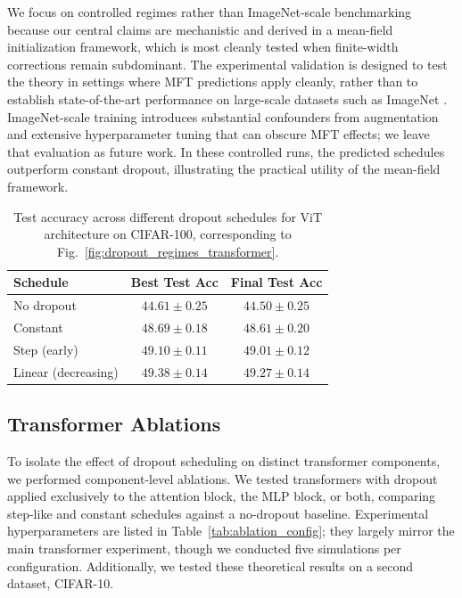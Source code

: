 \documentclass{article}
\theoremstyle{plain}
\theoremstyle{definition}
\theoremstyle{remark}
\begin{document}
We focus on controlled regimes rather than ImageNet-scale benchmarking because our central claims are mechanistic and derived in a mean-field initialization framework, which is most cleanly tested when finite-width corrections remain subdominant. The experimental validation is designed to test the theory in settings where MFT predictions apply cleanly, rather than to establish state-of-the-art performance on large-scale datasets such as ImageNet \cite{imagenet}. ImageNet-scale training introduces substantial confounders from augmentation and extensive hyperparameter tuning that can obscure MFT effects; we leave that evaluation as future work. In these controlled runs, the predicted schedules outperform constant dropout, illustrating the practical utility of the mean-field framework.

\begin{table}[h]
 \caption{Test accuracy across different dropout schedules for ViT architecture on CIFAR-100, corresponding to Fig.~\ref{fig:dropout_regimes_transformer}.}
 \label{tab:schedule_comparison_cifar_100}
 \centering
 \footnotesize
 \begin{tabular}{l c c}
 \toprule
 \textbf{Schedule} & \textbf{Best Test Acc} & \textbf{Final Test Acc} \\
 \midrule
 No dropout & $44.61 \pm 0.25$ & $44.50 \pm 0.25$ \\
 Constant & $48.69 \pm 0.18$ & $48.61 \pm 0.20$ \\
 Step (early) & $49.10 \pm 0.11$ & $49.01 \pm 0.12$ \\
 Linear (decreasing) & $49.38 \pm 0.14$ & $49.27 \pm 0.14$ \\
 \bottomrule
 \end{tabular}
\end{table}

\FloatBarrier
\clearpage










\subsection{Transformer Ablations}
To isolate the effect of dropout scheduling on distinct transformer components, we performed component-level ablations. We tested transformers with dropout applied exclusively to the attention block, the MLP block, or both, comparing step-like and constant schedules against a no-dropout baseline. Experimental hyperparameters are listed in Table~\ref{tab:ablation_config}; they largely mirror the main transformer experiment, though we conducted five simulations per configuration. Additionally, we tested these theoretical results on a second dataset, CIFAR-10.
\end{document}
